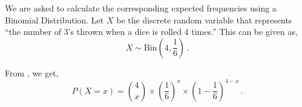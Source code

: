 %
%


\begin{subquestions}
	
\subquestion

We are asked to calculate the corresponding expected frequencies using a Binomial Distribution. Let $X$ be the discrete random variable that represents ``the number of 3's thrown when a dice is rolled 4 times.'' This can be given as,
\begin{equation}
	X \sim \text{Bin}\left(4, \frac{1}{6}\right) \,.
\end{equation}

From , we get,
\begin{equation}
	P(X = x) = { 4 \choose x} \times \left(\frac{1}{6} \right)^x \times \left(1-\frac{1}{6} \right)^{4-x} \,. \label{2008M:q3:BinEqn1}
\end{equation}
	

\end{subquestions}
